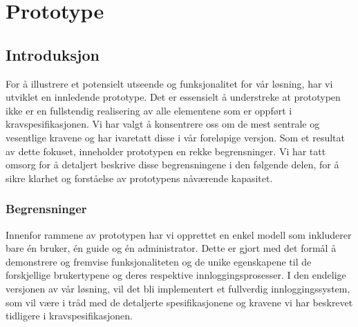\documentclass[../doc]{subfiles}
\begin{document}
\section{Prototype}
\subsection{Introduksjon}
For å illustrere et potensielt utseende og funksjonalitet for vår løsning, har vi utviklet en innledende prototype. Det er essensielt å understreke at prototypen ikke er en fullstendig realisering av alle elementene som er oppført i kravspesifikasjonen. Vi har valgt å konsentrere oss om de mest sentrale og vesentlige kravene og har ivaretatt disse i vår foreløpige versjon. Som et resultat av dette fokuset, inneholder prototypen en rekke begrensninger. Vi har tatt omsorg for å detaljert beskrive disse begrensningene i den følgende delen, for å sikre klarhet og forståelse av prototypens nåværende kapasitet.

\subsubsection{Begrensninger}
Innenfor rammene av prototypen har vi opprettet en enkel modell som inkluderer bare én bruker, én guide og én administrator. Dette er gjort med det formål å demonstrere og fremvise funksjonaliteten og de unike egenskapene til de forskjellige brukertypene og deres respektive innloggingsprosesser. I den endelige versjonen av vår løsning, vil det bli implementert et fullverdig innloggingssystem, som vil være i tråd med de detaljerte spesifikasjonene og kravene vi har beskrevet tidligere i kravspesifikasjonen.
\end{document}
